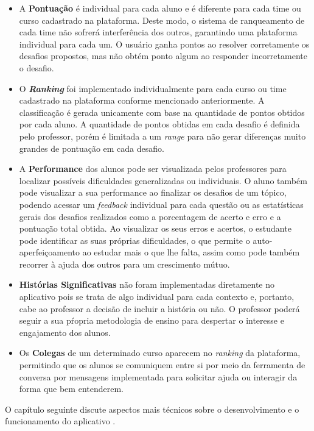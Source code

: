 \begin{itemize}
    \item A \textbf{Pontuação} é individual para cada aluno e é diferente para cada time ou curso cadastrado na plataforma. Deste modo, o sistema de ranqueamento de cada time não sofrerá interferência dos outros, garantindo uma plataforma individual para cada um. O usuário ganha pontos ao resolver corretamente os desafios propostos, mas não obtém ponto algum ao responder incorretamente o desafio.
    \item O \textbf{\textit{Ranking}} foi implementado individualmente para cada curso ou time cadastrado na plataforma conforme mencionado anteriormente. A classificação é gerada unicamente com base na quantidade de pontos obtidos por cada aluno. A quantidade de pontos obtidas em cada desafio é definida pelo professor, porém é limitada a um \textit{range} para não gerar diferenças muito grandes de pontuação em cada desafio.
    \item A \textbf{Performance} dos alunos pode ser visualizada pelos professores para localizar possíveis dificuldades generalizadas ou individuais. O aluno também pode visualizar a sua performance ao finalizar os desafios de um tópico, podendo acessar um \textit{feedback} individual para cada questão ou as estatísticas gerais dos desafios realizados como a porcentagem de acerto e erro e a pontuação total obtida. Ao visualizar os seus erros e acertos, o estudante pode identificar as suas próprias dificuldades, o que permite o auto-aperfeiçoamento ao estudar mais o que lhe falta, assim como pode também recorrer à ajuda dos outros para um crescimento mútuo.
    \item \textbf{Histórias Significativas} não foram implementadas diretamente no aplicativo pois se trata de algo individual para cada contexto e, portanto, cabe ao professor a decisão de incluir a história ou não. O professor poderá seguir a sua pŕopria metodologia de ensino para despertar o interesse e engajamento dos alunos.
    \item Os \textbf{Colegas} de um determinado curso aparecem no \textit{ranking} da plataforma, permitindo que os alunos se comuniquem entre si por meio da ferramenta de conversa por mensagens implementada para solicitar ajuda ou interagir da forma que bem entenderem.
\end{itemize}

O capítulo seguinte discute aspectos mais técnicos sobre o desenvolvimento e o funcionamento do aplicativo \appName.
